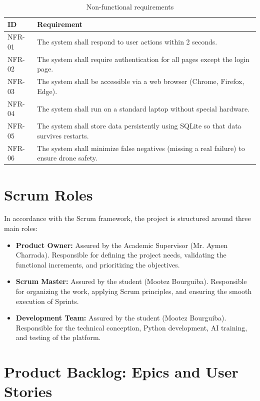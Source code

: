 \begin{table}[H]
\centering
\caption{Non-functional requirements}
\begin{tabular}{|p{1.5cm}|p{10cm}|}
\hline
\textbf{ID} & \textbf{Requirement} \\
\hline
NFR-01 & The system shall respond to user actions within 2 seconds. \\
\hline
NFR-02 & The system shall require authentication for all pages except the login page. \\
\hline
NFR-03 & The system shall be accessible via a web browser (Chrome, Firefox, Edge). \\
\hline
NFR-04 & The system shall run on a standard laptop without special hardware. \\
\hline
NFR-05 & The system shall store data persistently using SQLite so that data survives restarts. \\
\hline
NFR-06 & The system shall minimize false negatives (missing a real failure) to ensure drone safety. \\
\hline
\end{tabular}
\end{table}

\section{Scrum Roles}

In accordance with the Scrum framework, the project is structured around three main roles:

\begin{itemize}
    \item \textbf{Product Owner:} Assured by the Academic Supervisor (Mr. Aymen Charrada). Responsible for defining the project needs, validating the functional increments, and prioritizing the objectives.
    \item \textbf{Scrum Master:} Assured by the student (Mootez Bourguiba). Responsible for organizing the work, applying Scrum principles, and ensuring the smooth execution of Sprints.
    \item \textbf{Development Team:} Assured by the student (Mootez Bourguiba). Responsible for the technical conception, Python development, AI training, and testing of the platform.
\end{itemize}

\section{Product Backlog: Epics and User Stories}

